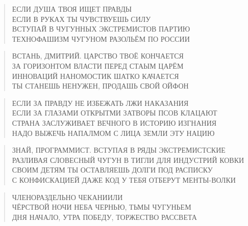 \poemtitle{***}
\begin{verse}
ЕСЛИ ДУША ТВОЯ ИЩЕТ ПРАВДЫ\\
    ЕСЛИ В РУКАХ ТЫ ЧУВСТВУЕШЬ СИЛУ\\
ВСТУПАЙ В ЧУГУННЫХ ЭКСТРЕМИСТОВ ПАРТИЮ\\
    ТЕХНОФАШИЗМ ЧУГУНОМ РАЗОЛЬЁМ ПО РОССИИ
\end{verse}

\poemtitle{***}
\begin{verse}
ВСТАНЬ, ДМИТРИЙ. ЦАРСТВО ТВОЁ КОНЧАЕТСЯ\\
ЗА ГОРИЗОНТОМ ВЛАСТИ ПЕРЕД СТАЫМ ЦАРЁМ\\
ИННОВАЦИЙ НАНОМОСТИК ШАТКО КАЧАЕТСЯ\\
ТЫ СТАНЕШЬ НЕНУЖЕН, ПРОДАШЬ СВОЙ ОЙФОН
\end{verse}

\poemtitle{***}
\begin{verse}
ЕСЛИ ЗА ПРАВДУ НЕ ИЗБЕЖАТЬ ЛЖИ НАКАЗАНИЯ\\
ЕСЛИ ЗА ГЛАЗАМИ ОТКРЫТМИ ЗАТВОРЫ ПСОВ КЛАЦАЮТ\\
СТРАНА ЗАСЛУЖИВАЕТ ВЕЧНОГО В ИСТОРИЮ ИЗГНАНИЯ\\
НАДО ВЫЖЕЧЬ НАПАЛМОМ С ЛИЦА ЗЕМЛИ ЭТУ НАЦИЮ
\end{verse}

\poemtitle{***}
\begin{verse}
ЗНАЙ, ПРОГРАММИСТ. ВСТУПАЯ В РЯДЫ ЭКСТРЕМИСТСКИЕ\\
РАЗЛИВАЯ СЛОВЕСНЫЙ ЧУГУН В ТИГЛИ ДЛЯ ИНДУСТРИЙ КОВКИ \\
СВОИМ ДЕТЯМ ТЫ ОСТАВЛЯЕШЬ ДОЛГИ ПОД РАСПИСКУ\\
С КОНФИСКАЦИЕЙ ДАЖЕ КОД У ТЕБЯ ОТБЕРУТ МЕНТЫ-ВОЛКИ
\end{verse}

\poemtitle{***}
\begin{verse}
ЧЛЕНОРАЗДЕЛЬНО ЧЕКАНИИЛИ \\
ЧЁРСТВОЙ НОЧИ НЕБА ЧЕРНЬЮ, ТЬМЫ ЧУГУНЬЕМ \\
ДНЯ НАЧАЛО, УТРА ПОБЕДУ, ТОРЖЕСТВО РАССВЕТА
\end{verse}

